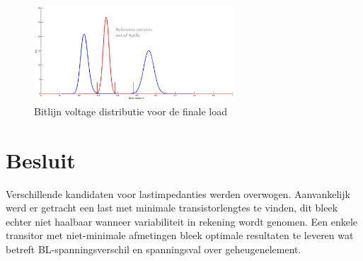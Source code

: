 \begin{figure}[!ht]
  \centering
  \includegraphics[width=0.67\textwidth]{../fig/hfdst-last-var2.png}
  \caption{Bitlijn voltage distributie voor de finale load}
  \label{fig:distswitch}
\end{figure}

\section{Besluit}
Verschillende kandidaten voor lastimpedanties werden overwogen. Aanvankelijk werd er getracht een last met minimale transistorlengtes te vinden, dit bleek echter niet haalbaar wanneer variabiliteit in rekening wordt genomen. Een enkele transitor met niet-minimale afmetingen bleek optimale resultaten te leveren wat betreft BL-spanningsverschil en spanningsval over geheugenelement.